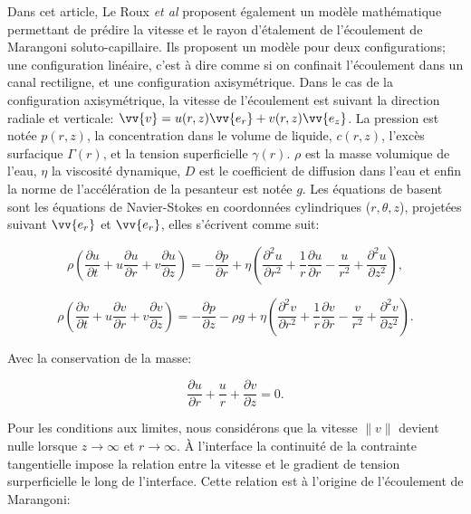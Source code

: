 Dans cet article, Le Roux \textit{et al} proposent également un modèle mathématique permettant de prédire la vitesse et le rayon d'étalement de l'écoulement de Marangoni soluto-capillaire. Ils proposent un modèle pour deux configurations; une configuration linéaire, c'est à dire comme si on confinait l'écoulement dans un canal rectiligne, et une configuration axisymétrique. Dans le cas de la configuration axisymétrique, la vitesse de l'écoulement est suivant la direction radiale et verticale: $\vv{v} = u(r,z)\vv{e_{r}}+ v(r,z)\vv{e_z}$. La pression est notée $p(r,z)$, la concentration dans le volume de liquide, $c(r,z)$, l'excès surfacique $\Gamma(r)$, et la tension superficielle $\gamma(r)$. $\rho$ est la masse volumique de l'eau, $\eta$ la viscosité dynamique, $D$ est le coefficient de diffusion dans l'eau et enfin la norme de l'accélération de la pesanteur est notée $g$. Les équations de basent sont les équations de Navier-Stokes en coordonnées cylindriques ($r,\theta,z$), projetées suivant $\vv{e_{r}}$ et $\vv{e_{r}}$, elles s'écrivent comme suit:

\begin{equation}
  \rho\left(\frac{\partial u}{\partial t}+u\frac{\partial u}{\partial r}+v\frac{\partial u}{\partial z}\right)=-\frac{\partial p}{\partial r}+\eta\left(\frac{\partial^2 u}{\partial r^2}+\frac{1}{r}\frac{\partial u}{\partial r}-\frac{u}{r^2}+\frac{\partial ^2 u}{\partial z^2}\right)\label{eq:Leroux1},
\end{equation}

\begin{equation}
  \rho \left(\frac{\partial v}{\partial t}+u\frac{\partial v}{\partial r} + v\frac{\partial v}{\partial z}\right)=-\frac{\partial p}{\partial z}-\rho g + \eta \left(\frac{\partial^2 v}{\partial r^2}+\frac{1}{r}\frac{\partial v}{\partial r}-\frac{v}{r^2}+\frac{\partial^2 v}{\partial z^2}\right)\label{eq:Leroux2}.
\end{equation}

Avec la conservation de la masse: 

\begin{equation}
  \frac{\partial u}{\partial r}+\frac{u}{r}+\frac{\partial v}{\partial z}=0\label{eq:Leroux3}.
\end{equation}

Pour les conditions aux limites, nous considérons que la vitesse $\|v\|$ devient nulle lorsque $z\rightarrow \infty$ et $r\rightarrow\infty$. À l'interface la continuité de la contrainte tangentielle impose la relation entre la vitesse et le gradient de tension surperficielle le long de l'interface. Cette relation est à l'origine de l'écoulement de Marangoni:

